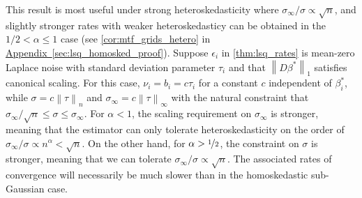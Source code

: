 \documentclass[ejs,noshowframe]{imsart}
\theoremstyle{plain}
\newtheorem{corollary}[theorem]{Corollary}
\theoremstyle{definition}
\newcommand{\aref}[1]{\hyperref[#1]{Appendix~\ref*{#1}}}
\renewcommand{\P}{\mathbb{P}}
\newcommand{\norm}[1]{\left\lVert #1 \right\rVert}
\renewcommand{\hat}{\widehat}
\newcommand{\half}{\nicefrac{1}{2}}
\begin{document}

This result is most useful under strong heteroskedasticity where $\sigma_\infty
/ \sigma \propto \sqrt{n}$, and slightly stronger rates with weaker
heteroskedasticy can be obtained in the $1/2<\alpha\leq 1$ case
(see \autoref{cor:mtf_grids_hetero} in \aref{sec:lsq_homosked_proof}).
Suppose $\epsilon_i$ in \autoref{thm:lsq_rates} is mean-zero Laplace noise
with standard deviation parameter $\tau_i$ and that $\norm{D\beta^*}_1$ 
satisfies
canonical scaling. For this case, $\nu_i = b_i = c \tau_i$ for a constant $c$
independent of $\beta^*_i$, while $\sigma = c \norm{\tau}_n$ and
$\sigma_\infty = c \norm{\tau}_\infty$ with the natural constraint that
$\sigma_\infty/\sqrt{n} \leq \sigma \leq \sigma_\infty$. For $\alpha < 1$,
the scaling requirement on $\sigma_\infty$ is stronger, meaning that the estimator
can only tolerate heteroskedasticity on the order of $\sigma_\infty / \sigma
\propto n^{\alpha}<\sqrt{n}$. On the other hand, for $\alpha > \half$, the constraint 
on $\sigma$ is stronger, meaning that we can tolerate $\sigma_\infty / \sigma \propto
\sqrt{n}$. The associated rates of convergence will necessarily be much slower than in
the homoskedastic sub-Gaussian case.
\end{document}
